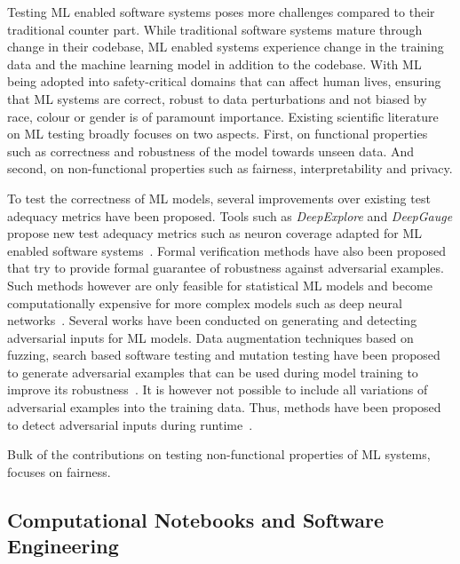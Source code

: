 \documentclass[conference]{IEEEtran}
\begin{document}
Testing ML enabled software systems poses more challenges compared to their traditional counter part. While traditional software systems mature through change in their codebase, ML enabled systems experience change in the training data and the machine learning model in addition to the codebase\cite{CITEME}. With ML being adopted into safety-critical domains that can affect human lives, ensuring that ML systems are correct, robust to data perturbations and not biased by race, colour or gender is of paramount importance. Existing scientific literature on ML testing broadly focuses on two aspects. First, on functional properties such as correctness and robustness of the model towards unseen data. And second, on non-functional properties such as fairness, interpretability and privacy.

To test the correctness of ML models, several improvements over existing test adequacy metrics have been proposed. Tools such as \textit{DeepExplore} and \textit{DeepGauge} propose new test adequacy metrics such as neuron coverage adapted for ML enabled software systems~\cite{pei2017deepexplore, ma2018deepgauge, gerasimou2020importance}. Formal verification methods have also been proposed that try to provide formal guarantee of robustness against adversarial examples. Such methods however are only feasible for statistical ML models and become computationally expensive for more complex models such as deep neural networks~\cite{zhu2021deepmemory, baluta2021scalable}. Several works have been conducted on generating and detecting adversarial inputs for ML models. Data augmentation techniques based on fuzzing, search based software testing and mutation testing have been proposed to generate adversarial examples that can be used during model training to improve its robustness~\cite{braiek2019deepevolution, gao2020fuzz, wang2021robot, zhang2020white}. It is however not possible to include all variations of adversarial examples into the training data. Thus, methods have been proposed to detect adversarial inputs during runtime~\cite{xiao2021self, wang2020dissector, wang2019adversarial, berend2020cats}.

%
Bulk of the contributions on testing non-functional properties of ML systems, focuses on fairness.

\subsection{Computational Notebooks and Software
  Engineering}\label{sec:notebooks}
\end{document}
